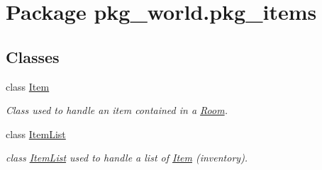 \hypertarget{namespacepkg__world_1_1pkg__items}{\section{Package pkg\-\_\-world.\-pkg\-\_\-items}
\label{namespacepkg__world_1_1pkg__items}
}
\subsection*{Classes}
\begin{DoxyCompactItemize}
\item 
class \hyperlink{classpkg__world_1_1pkg__items_1_1Item}{Item}
\begin{DoxyCompactList}\small\item\em Class used to handle an item contained in a \hyperlink{classpkg__world_1_1Room}{Room}. \end{DoxyCompactList}\item 
class \hyperlink{classpkg__world_1_1pkg__items_1_1ItemList}{Item\-List}
\begin{DoxyCompactList}\small\item\em class \hyperlink{classpkg__world_1_1pkg__items_1_1ItemList}{Item\-List} used to handle a list of \hyperlink{classpkg__world_1_1pkg__items_1_1Item}{Item} (inventory). \end{DoxyCompactList}\end{DoxyCompactItemize}
